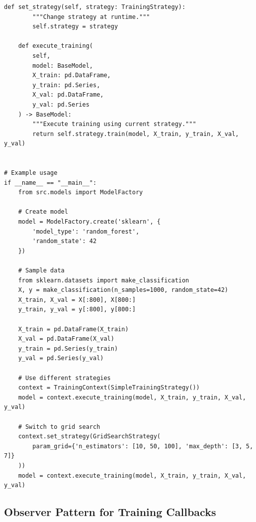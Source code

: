 \begin{lstlisting}[style=python, caption=Strategy pattern for flexible model selection]
    def set_strategy(self, strategy: TrainingStrategy):
        """Change strategy at runtime."""
        self.strategy = strategy

    def execute_training(
        self,
        model: BaseModel,
        X_train: pd.DataFrame,
        y_train: pd.Series,
        X_val: pd.DataFrame,
        y_val: pd.Series
    ) -> BaseModel:
        """Execute training using current strategy."""
        return self.strategy.train(model, X_train, y_train, X_val, y_val)


# Example usage
if __name__ == "__main__":
    from src.models import ModelFactory

    # Create model
    model = ModelFactory.create('sklearn', {
        'model_type': 'random_forest',
        'random_state': 42
    })

    # Sample data
    from sklearn.datasets import make_classification
    X, y = make_classification(n_samples=1000, random_state=42)
    X_train, X_val = X[:800], X[800:]
    y_train, y_val = y[:800], y[800:]

    X_train = pd.DataFrame(X_train)
    X_val = pd.DataFrame(X_val)
    y_train = pd.Series(y_train)
    y_val = pd.Series(y_val)

    # Use different strategies
    context = TrainingContext(SimpleTrainingStrategy())
    model = context.execute_training(model, X_train, y_train, X_val, y_val)

    # Switch to grid search
    context.set_strategy(GridSearchStrategy(
        param_grid={'n_estimators': [10, 50, 100], 'max_depth': [3, 5, 7]}
    ))
    model = context.execute_training(model, X_train, y_train, X_val, y_val)
\end{lstlisting}

\subsection{Observer Pattern for Training Callbacks}

